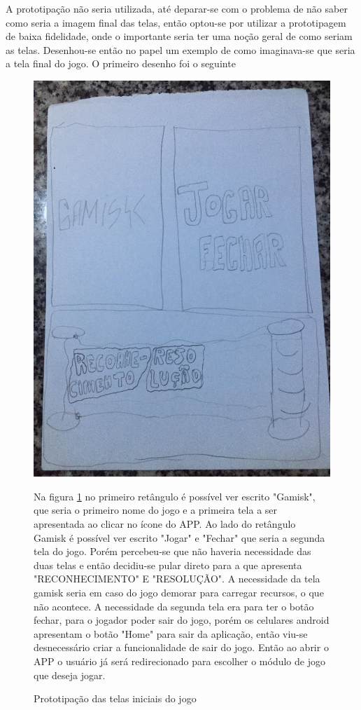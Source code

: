 A prototipação não seria utilizada, até deparar-se com o problema de não saber como seria a imagem final das telas, então optou-se por utilizar a prototipagem de baixa fidelidade, onde o importante seria ter uma noção geral de como seriam as telas. Desenhou-se então no papel um exemplo de como imaginava-se que seria a tela final do jogo. O primeiro desenho foi o seguinte

\begin{figure}[H]
\centering
\caption{Prototipação das telas iniciais do jogo}
\label{prot0}
\includegraphics[scale=0.4]{figuras/prot0.jpg}

Na figura \ref{prot0} no primeiro retângulo é possível ver escrito "Gamisk", que seria o primeiro nome do jogo e a primeira tela a ser apresentada ao clicar no ícone do APP. Ao lado do retângulo Gamisk é possível ver escrito "Jogar" e "Fechar" que seria a segunda tela do jogo. Porém percebeu-se que não haveria necessidade das duas telas e então decidiu-se pular direto para a que apresenta "RECONHECIMENTO" E "RESOLUÇÃO". A necessidade da tela gamisk seria em caso do jogo demorar para carregar recursos, o que não acontece. A necessidade da segunda tela era para ter o botão fechar, para o jogador poder sair do jogo, porém os celulares android apresentam o botão "Home" para sair da aplicação, então viu-se desnecessário criar a funcionalidade de sair do jogo. Então ao abrir o APP o usuário já será redirecionado para escolher o módulo de jogo que deseja jogar.

\end{figure}

